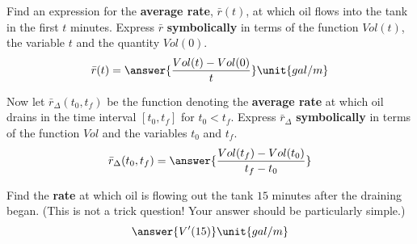 \documentclass{ximera}
\begin{document}
\begin{exercise}
\begin{exercise}
\begin{exercise}
\begin{exercise}
\begin{exercise}
\begin{exercise}
\begin{exercise}
Find an expression for the \textbf{average rate}, $\bar{r}(t)$, at which oil flows into the tank in the first $t$ minutes. Express $\bar{r}$ \textbf{symbolically} in terms of the function $Vol(t)$, the variable $t$ and the quantity $Vol(0)$.
\[
\bar{r}(t)=\answer{\frac{Vol(t)-Vol(0)}{t}}\unit{gal/m}
\]
\begin{exercise}
Now let $\bar{r}_{\Delta}(t_0,t_f)$ be the function denoting the \textbf{average rate} at which oil drains in the time interval $[t_0,t_f]$ for $t_0<t_f$. Express $\bar{r}_{\Delta}$ \textbf{symbolically} in terms of the function $Vol$ and the variables $t_0$ and $t_f$.
\[
\bar{r}_{\Delta}(t_0,t_f)=\answer{\frac{Vol(t_f)-Vol(t_0)}{t_f-t_0}}
\]
\begin{exercise}
Find the \textbf{rate} at which oil is flowing out the tank $15$ minutes after the draining began. (This is not a trick question! Your answer should be particularly simple.)
\[
\answer{V'(15)}\unit{gal/m}
\]
\end{exercise}
\end{exercise}
\end{exercise}
\end{exercise}
\end{exercise}
\end{exercise}
\end{exercise}
\end{exercise}
\end{exercise}
\end{document}
